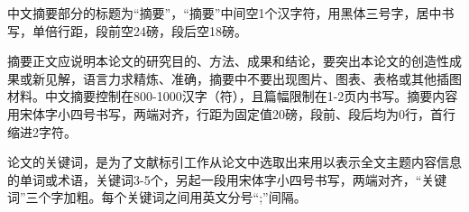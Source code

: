 \begin{cnabstract}
	
	中文摘要部分的标题为“摘要”，“摘要”中间空1个汉字符，用黑体三号字，居中书写，单倍行距，段前空24磅，段后空18磅。
	
	摘要正文应说明本论文的研究目的、方法、成果和结论，要突出本论文的创造性成果或新见解，语言力求精炼、准确，摘要中不要出现图片、图表、表格或其他插图材料。中文摘要控制在800-1000汉字（符），且篇幅限制在1-2页内书写。摘要内容用宋体字小四号书写，两端对齐，行距为固定值20磅，段前、段后均为0行，首行缩进2字符。
	
	论文的关键词，是为了文献标引工作从论文中选取出来用以表示全文主题内容信息的单词或术语，关键词3-5个，另起一段用宋体字小四号书写，两端对齐，“关键词”三个字加粗。每个关键词之间用英文分号“;”间隔。
	
	
	
\end{cnabstract}

